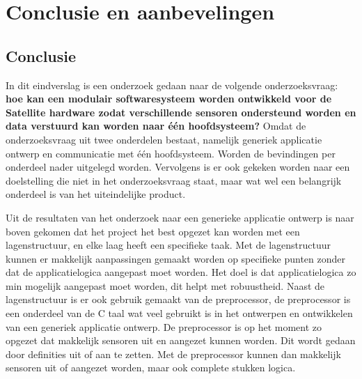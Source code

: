 \chapter{Conclusie en aanbevelingen}
\section{Conclusie}
In dit eindverslag is een onderzoek gedaan naar de volgende onderzoeksvraag: \textbf{hoe kan een modulair softwaresysteem worden ontwikkeld voor de Satellite hardware zodat verschillende sensoren ondersteund worden en data verstuurd kan worden naar één hoofdsysteem?} Omdat de onderzoeksvraag uit twee onderdelen bestaat, namelijk generiek applicatie ontwerp en communicatie met één hoofdsysteem. Worden de bevindingen per onderdeel nader uitgelegd worden. Vervolgens is er ook gekeken worden naar een doelstelling die niet in het onderzoeksvraag staat, maar wat wel een belangrijk onderdeel is van het uiteindelijke product. \newline

\noindent Uit de resultaten van het onderzoek naar een generieke applicatie ontwerp is naar boven gekomen dat het project het best opgezet kan worden met een lagenstructuur, en elke laag heeft een specifieke taak. Met de lagenstructuur kunnen er makkelijk aanpassingen gemaakt worden op specifieke punten zonder dat de applicatielogica aangepast moet worden. Het doel is dat applicatielogica zo min mogelijk aangepast moet worden, dit helpt met robuustheid. Naast de lagenstructuur is er ook gebruik gemaakt van de preprocessor, de preprocessor is een onderdeel van de C taal wat veel gebruikt is in het ontwerpen en ontwikkelen van een generiek applicatie ontwerp. De preprocessor is op het moment zo opgezet dat makkelijk sensoren uit en aangezet kunnen worden. Dit wordt gedaan door definities uit of aan te zetten. Met de preprocessor kunnen dan makkelijk sensoren uit of aangezet worden, maar ook complete stukken logica. \newline

